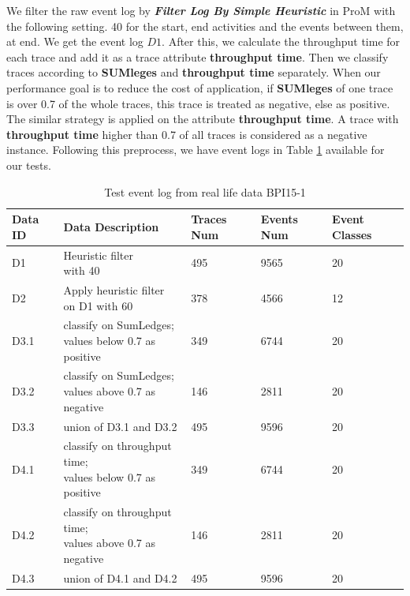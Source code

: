 We filter the raw event log by \textbf{\emph{Filter Log By Simple Heuristic}} in ProM with the following setting. 40 for the start, end  activities and the events between them, at end. We get the event log $D1$. After this, we calculate the throughput time for each trace and add it as a trace attribute \textbf{throughput time}. 
Then we classify traces according to  \textbf{SUMleges} and  \textbf{throughput time} separately. When our performance goal is to reduce the cost of application, if \textbf{SUMleges} of one trace is over 0.7 of the whole traces, this trace is treated as negative, else as positive. The similar strategy is applied on the attribute \textbf{throughput time}. A trace with \textbf{throughput time} higher than 0.7 of all traces is considered as a negative instance. Following this preprocess, we have event logs in Table \ref{tab:event-log} available for our tests. 
\begin{table}	
	\caption{Test event log from real life data BPI15-1}
	\label{tab:event-log}
	\begin{tabular}{|l|l|l|l|l|}
		\hline
		Data ID & Data Description                                & Traces Num & Events Num & Event Classes \\ \hline
		D1      & \makecell{Heuristic filter  \\ with 40 }                     & 495        & 9565       & 20             \\ \hline
		D2      & \makecell{Apply heuristic filter \\ on D1 with 60      }     & 378        & 4566       & 12            \\ \hline
		D3.1    & \makecell{classify on SumLedges;  \\ values below 0.7 as positive} & 349        & 6744       & 20             \\ \hline
		D3.2    & \makecell{classify on SumLedges;  \\ values above 0.7 as negative }& 146        & 2811       & 20             \\  \hline
		D3.3    & union of D3.1 and D3.2                             & 495        & 9596       & 20             \\ \hline
		D4.1    & \makecell{ classify on throughput time;  \\ values below 0.7 as positive} & 349        & 6744       & 20             \\ \hline
		D4.2    & \makecell{classify on throughput time;  \\ values above 0.7 as negative} & 146        & 2811       & 20            \\ \hline
		D4.3    & union of D4.1 and D4.2                             & 495        & 9596       & 20           \\ \hline
	\end{tabular}
\end{table}

